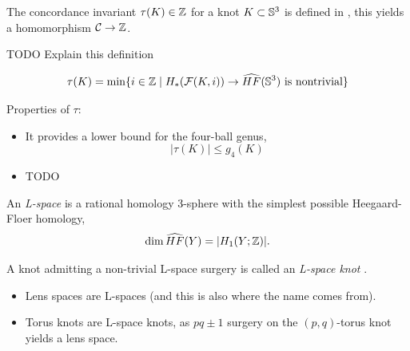 The concordance invariant $\tau(K) \in \mathbb{Z}$ for a knot $K \subset \mathbb{S}^{3}$
is defined in \citep{ozsvath2003knot},
this yields a homomorphism $\mathcal{C} \rightarrow \mathbb{Z}$.

TODO Explain this definition
\begin{definition}
	\begin{equation*}
		\tau(K) = \min \{ i \in \mathbb{Z} \mid 
			H_{*}(\mathcal{F}(K, i))
			\rightarrow
			\widehat{HF}(\mathbb{S}^{3}) 
			\textrm{ is nontrivial} \}
	\end{equation*}
\end{definition}

Properties of $\tau$:
\begin{itemize}
	\item It provides a lower bound for the four-ball genus,
	\[
		| \tau(K) | \le g_{4}(K)
	\]
	\item TODO %
\end{itemize}


\begin{definition}
	An \textit{L-space}  is a rational homology 3-sphere
	with the simplest possible Heegaard-Floer homology,
	\begin{equation*}
		\dim \widehat{HF}(Y) = | H_{1}(Y ; \mathbb{Z}) |.
	\end{equation*}
	
	A knot admitting a non-trivial L-space surgery is
	called an \textit{L-space knot}
	.
\end{definition}

\begin{example}
	\begin{itemize}
		\item Lens spaces are L-spaces (and this is also where the
		name comes from).
		
		\item Torus knots are L-space knots, as
		$pq \pm 1$ surgery on the $(p,q)$-torus knot yields a
		lens space. 
	\end{itemize}
\end{example}




